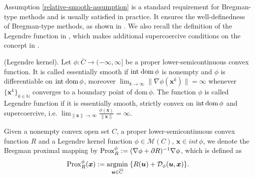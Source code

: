 \documentclass[twoside,11pt]{article}
\newcommand{\cD}{\mathcal D}
\newcommand{\cM}{\mathcal M}
\DeclareMathOperator*{\argmin}{argmin}
\def\vu{{\bm{u}}}
\def\vx{{\bm{x}}}
\begin{document}
 Assumption \ref{relative-smooth-assumption} is a standard requirement for Bregman-type methods and is usually satisfied in practice. 
 It ensures the well-definedness of Bregman-type methods, as shown in \cite{bolte2018first,latafat2022bregman}. We also recall the definition of the Legendre function in \cite{latafat2022bregman}, which makes additional supercoercive conditions on the concept in \cite{rockafellar1997convex}. %

\begin{definition}\label{Legendre}
(Legendre kernel). Let $\phi:{\overline{C}}\rightarrow(-\infty,\infty]$ be a proper
lower-semicontinuous convex function. 
It is called essentially smooth if $\text{int\;dom}\,\phi$ is nonempty and $\phi$ is differentiable on $\text{int\;dom}\,\phi$, moreover $\lim_{k\rightarrow\infty}\|\nabla\phi({\vx^k})\|=\infty$ whenever $\{{\vx^k}\}_{k\in\mathbb N}$ converges to a boundary point of $\text{dom}\,\phi$. The function $\phi$ is called Legendre function if it is essentially smooth, {strictly} convex on $\text{int\,dom}\,\phi$ and supercoercive, i.e. $\lim_{\|\vx\|\rightarrow\infty}\frac{\phi(\vx)}{\|\vx\|}=\infty$.
\end{definition}

\begin{definition}\label{Bregman-prox-maping}
Given a nonempty convex open set $C$, a proper lower-semicontinuous convex function $R$ and a Legendre kernel function $\phi\in\cM(C)$, $\vx\in int\,\phi$, we denote the Bregman proximal mapping by ${\rm Prox}^\phi_R:=(\nabla\phi+\partial R)^{-1}\nabla\phi$, which is defined as
\begin{equation}
{\rm Prox}^\phi_R(\vx):=\argmin_{\vu\in\overline{C}}\;\{R(\vu)+\cD_\phi(\vu,\vx)\}.
\label{Breg-prox-def}
\end{equation}  
\end{definition}

\end{document}
